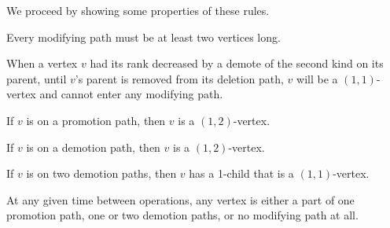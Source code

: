 We proceed by showing some properties of these rules.

\begin{obs}
Every modifying path must be at least two vertices long.
\end{obs}

\begin{obs}
When a vertex $v$ had its rank decreased by a demote of the second kind on its parent, until $v$'s parent is removed from its deletion path, $v$ will be a $(1,1)$-vertex and cannot enter any modifying path. 
\end{obs}

\begin{obs}
If $v$ is on a promotion path, then $v$ is a $(1,2)$-vertex.
\end{obs}

\begin{obs}
If $v$ is on a demotion path, then $v$ is a $(1,2)$-vertex.
\end{obs}

\begin{obs}
If $v$ is on two demotion paths, then $v$ has a 1-child that is a $(1,1)$-vertex.
\end{obs}

\begin{prop}
At any given time between operations, any vertex is either a part of one promotion path, one or two demotion paths, or no modifying path at all.
\label{thm-constant-paths}
\end{prop}

